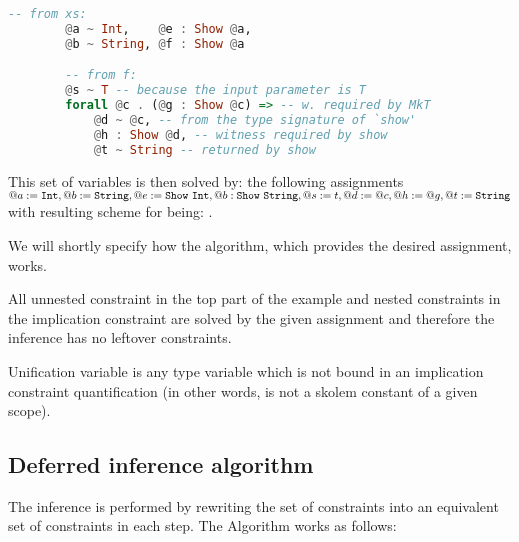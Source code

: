 \begin{ex}[Existentials]
    \begin{lstlisting}[language=Haskell]
        -- from xs:
        @a ~ Int,    @e : Show @a,
        @b ~ String, @f : Show @a

        -- from f:
        @s ~ T -- because the input parameter is T
        forall @c . (@g : Show @c) => -- w. required by MkT
            @d ~ @c, -- from the type signature of `show'
            @h : Show @d, -- witness required by show
            @t ~ String -- returned by show
    \end{lstlisting}

    This set of variables is then solved by: the following assignments $@a := \mathtt{Int}, @b := \mathtt{String}, @e := \mathtt{Show}\ \mathtt{Int}, @b : \mathtt{Show}\ \mathtt{String}, @s := t, @d := @c, @h := @g, @t := \mathtt{String}$ with resulting scheme for  being: .

    We will shortly specify how the algorithm, which provides the desired assignment, works.

    All unnested constraint in the top part of the example and nested constraints in the implication constraint are solved by the given assignment and therefore the inference has no leftover constraints.
\end{ex}

\begin{defn}
    Unification variable is any type variable which is not bound in an implication constraint quantification (in other words, is not a skolem constant of a given scope).
\end{defn}

\subsection{Deferred inference algorithm}

The inference is performed by rewriting the set of constraints into an equivalent set of constraints in each step. The Algorithm works as follows:

